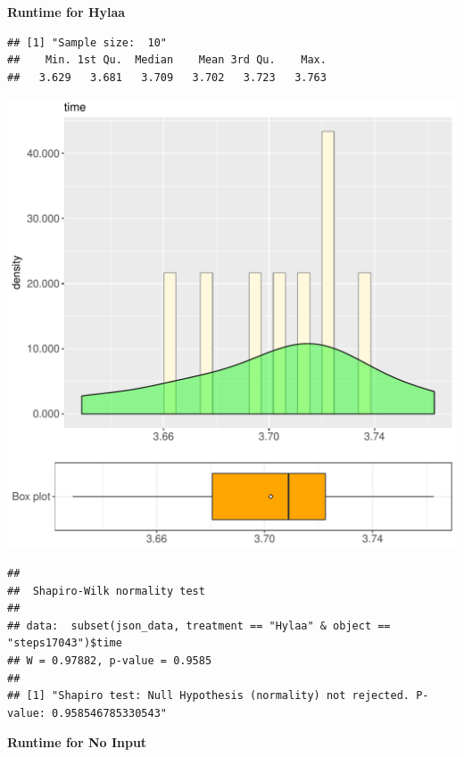 \documentclass{article}\usepackage[]{graphicx}\usepackage[]{color}
\makeatletter
\def\maxwidth{ %
  \ifdim\Gin@nat@width>\linewidth
    \linewidth
  \else
    \Gin@nat@width
  \fi
}
\newenvironment{kframe}{%
 \def\at@end@of@kframe{}%
 \ifinner\ifhmode%
  \def\at@end@of@kframe{\end{minipage}}%
  \begin{minipage}{\columnwidth}%
 \fi\fi%
 \def\FrameCommand##1{\hskip\@totalleftmargin \hskip-\fboxsep
 \colorbox{shadecolor}{##1}\hskip-\fboxsep
     \hskip-\linewidth \hskip-\@totalleftmargin \hskip\columnwidth}%
 \MakeFramed {\advance\hsize-\width
   \@totalleftmargin\z@ \linewidth\hsize
   \@setminipage}}%
 {\par\unskip\endMakeFramed%
 \at@end@of@kframe}
\newenvironment{knitrout}{}{} %
\makeatother
\begin{document}
 \textbf{Runtime for Hylaa}
\begin{knitrout}
\color{fgcolor}\begin{kframe}
\begin{verbatim}
## [1] "Sample size:  10"
##    Min. 1st Qu.  Median    Mean 3rd Qu.    Max. 
##   3.629   3.681   3.709   3.702   3.723   3.763
\end{verbatim}
\end{kframe}
\includegraphics[width=\maxwidth]{figure/RH4_Hylaa_steps17043-1} 
\begin{kframe}\begin{verbatim}
## 
## 	Shapiro-Wilk normality test
## 
## data:  subset(json_data, treatment == "Hylaa" & object == "steps17043")$time
## W = 0.97882, p-value = 0.9585
## 
## [1] "Shapiro test: Null Hypothesis (normality) not rejected. P-value: 0.958546785330543"
\end{verbatim}
\end{kframe}
\end{knitrout}
 \textbf{Runtime for No Input}
\end{document}
